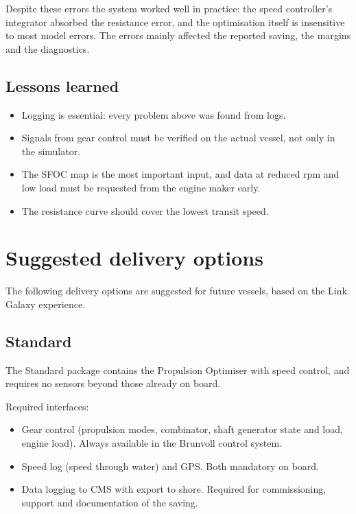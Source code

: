 \documentclass[a4paper,11pt]{article}
\begin{document}
Despite these errors the system worked well in practice: the speed
controller's integrator absorbed the resistance error, and the
optimisation itself is insensitive to most model errors.  The errors
mainly affected the reported saving, the margins and the diagnostics.

\subsection{Lessons learned}
\label{sec:org5cf5b86}

\begin{itemize}
\item Logging is essential: every problem above was found from logs.
\item Signals from gear control must be verified on the actual vessel, not
only in the simulator.
\item The SFOC map is the most important input, and data at reduced rpm and
low load must be requested from the engine maker early.
\item The resistance curve should cover the lowest transit speed.
\end{itemize}

\section{Suggested delivery options}
\label{sec:org6e86881}

The following delivery options are suggested for future vessels, based
on the Link Galaxy experience.

\subsection{Standard}
\label{sec:org7899d90}

The Standard package contains the Propulsion Optimiser with speed
control, and requires no sensors beyond those already on board.

Required interfaces:
\begin{itemize}
\item Gear control (propulsion modes, combinator, shaft generator state and
load, engine load).  Always available in the Brunvoll control system.
\item Speed log (speed through water) and GPS.  Both mandatory on board.
\item Data logging to CMS with export to shore.  Required for
commissioning, support and documentation of the saving.
\end{itemize}
\end{document}

